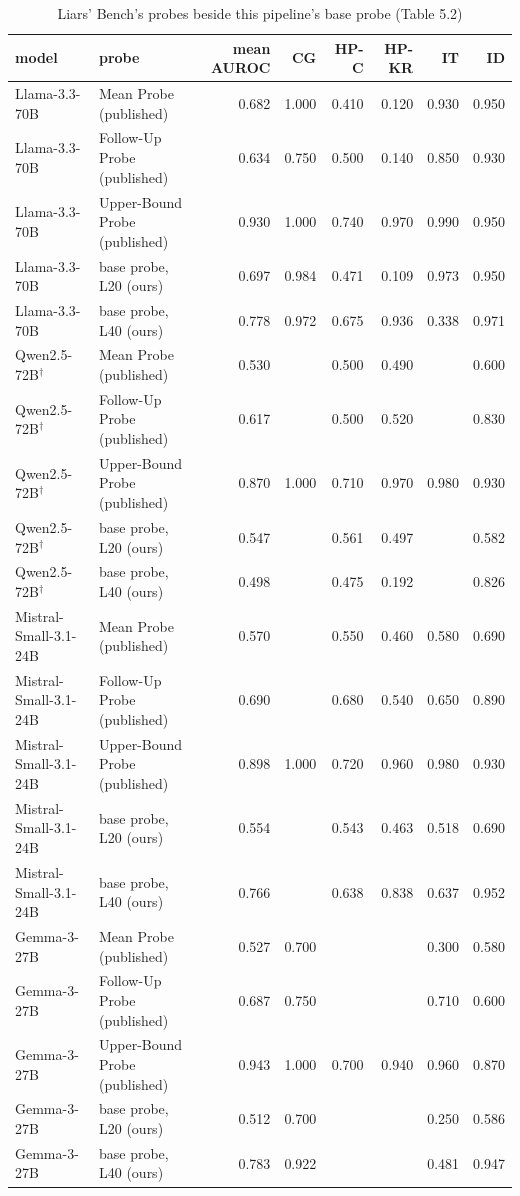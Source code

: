 \begin{table}
\caption{Liars' Bench's probes beside this pipeline's base probe (Table 5.2)}
\label{tab:x-liars_bench}
\begin{tabular}{llrrrrrr}
\toprule
model & probe & mean AUROC & CG & HP-C & HP-KR & IT & ID \\
\midrule
Llama-3.3-70B & Mean Probe (published) & 0.682 & 1.000 & 0.410 & 0.120 & 0.930 & 0.950 \\
Llama-3.3-70B & Follow-Up Probe (published) & 0.634 & 0.750 & 0.500 & 0.140 & 0.850 & 0.930 \\
Llama-3.3-70B & Upper-Bound Probe (published) & 0.930 & 1.000 & 0.740 & 0.970 & 0.990 & 0.950 \\
Llama-3.3-70B & base probe, L20 (ours) & 0.697 & 0.984 & 0.471 & 0.109 & 0.973 & 0.950 \\
Llama-3.3-70B & base probe, L40 (ours) & 0.778 & 0.972 & 0.675 & 0.936 & 0.338 & 0.971 \\
Qwen2.5-72B$^\dagger$ & Mean Probe (published) & 0.530 &  & 0.500 & 0.490 &  & 0.600 \\
Qwen2.5-72B$^\dagger$ & Follow-Up Probe (published) & 0.617 &  & 0.500 & 0.520 &  & 0.830 \\
Qwen2.5-72B$^\dagger$ & Upper-Bound Probe (published) & 0.870 & 1.000 & 0.710 & 0.970 & 0.980 & 0.930 \\
Qwen2.5-72B$^\dagger$ & base probe, L20 (ours) & 0.547 &  & 0.561 & 0.497 &  & 0.582 \\
Qwen2.5-72B$^\dagger$ & base probe, L40 (ours) & 0.498 &  & 0.475 & 0.192 &  & 0.826 \\
Mistral-Small-3.1-24B & Mean Probe (published) & 0.570 &  & 0.550 & 0.460 & 0.580 & 0.690 \\
Mistral-Small-3.1-24B & Follow-Up Probe (published) & 0.690 &  & 0.680 & 0.540 & 0.650 & 0.890 \\
Mistral-Small-3.1-24B & Upper-Bound Probe (published) & 0.898 & 1.000 & 0.720 & 0.960 & 0.980 & 0.930 \\
Mistral-Small-3.1-24B & base probe, L20 (ours) & 0.554 &  & 0.543 & 0.463 & 0.518 & 0.690 \\
Mistral-Small-3.1-24B & base probe, L40 (ours) & 0.766 &  & 0.638 & 0.838 & 0.637 & 0.952 \\
Gemma-3-27B & Mean Probe (published) & 0.527 & 0.700 &  &  & 0.300 & 0.580 \\
Gemma-3-27B & Follow-Up Probe (published) & 0.687 & 0.750 &  &  & 0.710 & 0.600 \\
Gemma-3-27B & Upper-Bound Probe (published) & 0.943 & 1.000 & 0.700 & 0.940 & 0.960 & 0.870 \\
Gemma-3-27B & base probe, L20 (ours) & 0.512 & 0.700 &  &  & 0.250 & 0.586 \\
Gemma-3-27B & base probe, L40 (ours) & 0.783 & 0.922 &  &  & 0.481 & 0.947 \\
\bottomrule
\end{tabular}
\end{table}
